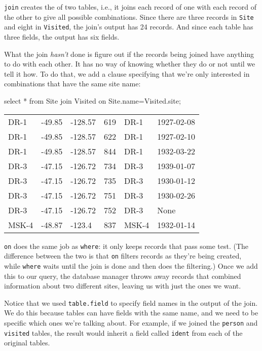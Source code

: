 \documentclass{book}
\begin{document}
\texttt{join} creates the  of
two tables, i.e., it joins each record of one with each record of the
other to give all possible combinations. Since there are three records
in \texttt{Site} and eight in \texttt{Visited}, the join's output has 24
records. And since each table has three fields, the output has six
fields.

What the join \emph{hasn't} done is figure out if the records being
joined have anything to do with each other. It has no way of knowing
whether they do or not until we tell it how. To do that, we add a clause
specifying that we're only interested in combinations that have the same
site name:

\begin{VerbIn}
select * from Site join Visited on Site.name=Visited.site;
\end{VerbIn}

\begin{tabular}{llllll}
DR-1 & -49.85 & -128.57 & 619 & DR-1 & 1927-02-08 \\
DR-1 & -49.85 & -128.57 & 622 & DR-1 & 1927-02-10 \\
DR-1 & -49.85 & -128.57 & 844 & DR-1 & 1932-03-22 \\
DR-3 & -47.15 & -126.72 & 734 & DR-3 & 1939-01-07 \\
DR-3 & -47.15 & -126.72 & 735 & DR-3 & 1930-01-12 \\
DR-3 & -47.15 & -126.72 & 751 & DR-3 & 1930-02-26 \\
DR-3 & -47.15 & -126.72 & 752 & DR-3 & None \\
MSK-4 & -48.87 & -123.4 & 837 & MSK-4 & 1932-01-14 \\
\end{tabular}

\texttt{on} does the same job as \texttt{where}: it only keeps records
that pass some test. (The difference between the two is that \texttt{on}
filters records as they're being created, while \texttt{where} waits
until the join is done and then does the filtering.) Once we add this to
our query, the database manager throws away records that combined
information about two different sites, leaving us with just the ones we
want.

Notice that we used \texttt{table.field} to specify field names in the
output of the join. We do this because tables can have fields with the
same name, and we need to be specific which ones we're talking about.
For example, if we joined the \texttt{person} and \texttt{visited}
tables, the result would inherit a field called \texttt{ident} from each
of the original tables.
\end{document}
